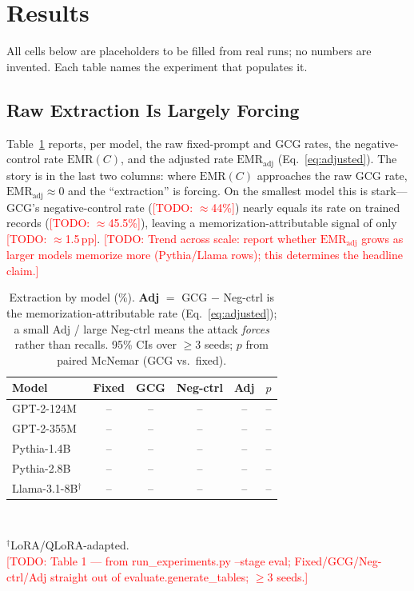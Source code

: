 \documentclass[letterpaper,twocolumn,10pt]{article}
\newcommand{\todo}[1]{\textcolor{red}{[TODO: #1]}}
\begin{document}
\section{Results}
\label{sec:results}

All cells below are placeholders to be filled from real runs; no numbers are
invented. Each table names the experiment that populates it.

\subsection{Raw Extraction Is Largely Forcing}
Table~\ref{tab:main} reports, per model, the raw fixed-prompt and GCG rates, the
negative-control rate $\mathrm{EMR}(C)$, and the adjusted rate
$\mathrm{EMR}_{\text{adj}}$ (Eq.~\ref{eq:adjusted}). The story is in the last two
columns: where $\mathrm{EMR}(C)$ approaches the raw GCG rate,
$\mathrm{EMR}_{\text{adj}}\!\approx\!0$ and the ``extraction'' is forcing. On the
smallest model this is stark---GCG's negative-control rate
(\todo{${\approx}$44\%}) nearly equals its rate on trained records
(\todo{${\approx}$45.5\%}), leaving a memorization-attributable signal of only
\todo{${\approx}$1.5\,pp}. \todo{Trend across scale: report whether
$\mathrm{EMR}_{\text{adj}}$ grows as larger models memorize more (Pythia/Llama
rows); this determines the headline claim.}

\begin{table}[t]
\centering
\caption{Extraction by model (\%). \textbf{Adj} $=$ GCG $-$ Neg-ctrl is the
memorization-attributable rate (Eq.~\ref{eq:adjusted}); a small Adj / large
Neg-ctrl means the attack \emph{forces} rather than recalls. 95\% CIs over
$\ge 3$ seeds; $p$ from paired McNemar (GCG vs.\ fixed).}
\label{tab:main}
\small
\begin{tabular}{@{}lccccc@{}}
\toprule
\textbf{Model} & \textbf{Fixed} & \textbf{GCG} & \textbf{Neg-ctrl} & \textbf{Adj} & $p$ \\
\midrule
GPT-2-124M    & -- & -- & -- & -- & -- \\
GPT-2-355M    & -- & -- & -- & -- & -- \\
Pythia-1.4B   & -- & -- & -- & -- & -- \\
Pythia-2.8B   & -- & -- & -- & -- & -- \\
Llama-3.1-8B$^{\dagger}$ & -- & -- & -- & -- & -- \\
\bottomrule
\end{tabular}
\\[2pt]
\raggedright\footnotesize $^{\dagger}$LoRA/QLoRA-adapted.\\
\todo{Table 1 --- from run\_experiments.py --stage eval; Fixed/GCG/Neg-ctrl/Adj
straight out of evaluate.generate\_tables; $\ge 3$ seeds.}
\end{table}
\end{document}
